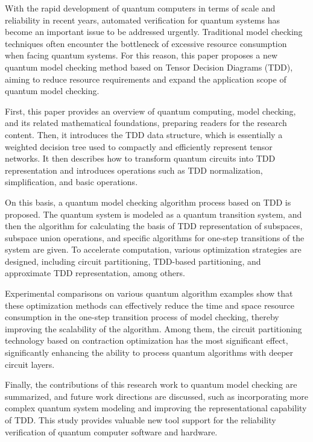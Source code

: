 With the rapid development of quantum computers in terms of scale and reliability in recent years, automated verification for quantum systems has become an important issue to be addressed urgently. Traditional model checking techniques often encounter the bottleneck of excessive resource consumption when facing quantum systems. For this reason, this paper proposes a new quantum model checking method based on Tensor Decision Diagrams (TDD), aiming to reduce resource requirements and expand the application scope of quantum model checking.

First, this paper provides an overview of quantum computing, model checking, and its related mathematical foundations, preparing readers for the research content. Then, it introduces the TDD data structure, which is essentially a weighted decision tree used to compactly and efficiently represent tensor networks. It then describes how to transform quantum circuits into TDD representation and introduces operations such as TDD normalization, simplification, and basic operations.

On this basis, a quantum model checking algorithm process based on TDD is proposed. The quantum system is modeled as a quantum transition system, and then the algorithm for calculating the basis of TDD representation of subspaces, subspace union operations, and specific algorithms for one-step transitions of the system are given. To accelerate computation, various optimization strategies are designed, including circuit partitioning, TDD-based partitioning, and approximate TDD representation, among others.

Experimental comparisons on various quantum algorithm examples show that these optimization methods can effectively reduce the time and space resource consumption in the one-step transition process of model checking, thereby improving the scalability of the algorithm. Among them, the circuit partitioning technology based on contraction optimization has the most significant effect, significantly enhancing the ability to process quantum algorithms with deeper circuit layers.

Finally, the contributions of this research work to quantum model checking are summarized, and future work directions are discussed, such as incorporating more complex quantum system modeling and improving the representational capability of TDD. This study provides valuable new tool support for the reliability verification of quantum computer software and hardware.


\pagestyle{enfrontmatterstyle}%
\cleardoublepage\pagestyle{frontmatterstyle}%

